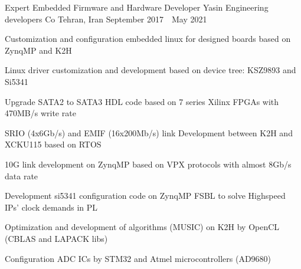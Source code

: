 \begin{cventries}
  \cventry
    {Expert Embedded Firmware and Hardware Developer} %
    {Yasin Engineering developers Co} %
    {Tehran, Iran} %
    {September 2017~\textendash~May 2021} %
    {
      \begin{cvitems} %
        \item {Customization and configuration embedded linux for designed boards based on ZynqMP and K2H}
	\item {Linux driver customization and development based on device tree: KSZ9893 and Si5341}
        \item {Upgrade SATA2 to SATA3 HDL code based on 7 series Xilinx FPGAs with 470MB/s write rate}
        \item {SRIO (4x6Gb/s) and EMIF (16x200Mb/s) link Development between K2H and XCKU115 based on RTOS}
	\item {10G link development on ZynqMP based on VPX protocols with almost 8Gb/s data rate}
        \item {Development si5341 configuration code on ZynqMP FSBL to solve Highspeed IPs' clock demands in PL}
	\item {Optimization and development of algorithms (MUSIC) on K2H by OpenCL (CBLAS and LAPACK libs)}
	\item {Configuration ADC ICs by STM32 and Atmel microcontrollers (AD9680)}
      \end{cvitems}
    }


\end{cventries}
